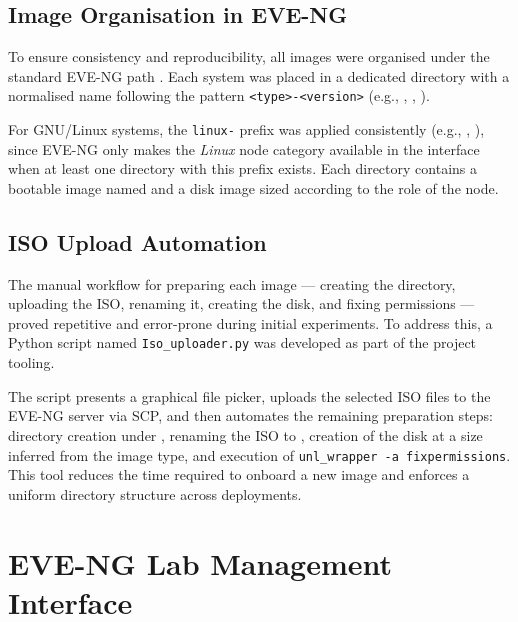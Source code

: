 \subsection{Image Organisation in EVE-NG}

To ensure consistency and reproducibility, all images were organised under the
standard EVE-NG path . Each system was placed in
a dedicated directory with a normalised name following the pattern
\texttt{<type>-<version>} (e.g., ,
, ).

For GNU/Linux systems, the \texttt{linux-} prefix was applied consistently
(e.g., , ), since
EVE-NG only makes the \textit{Linux} node category available in the interface when
at least one directory with this prefix exists. Each directory contains a bootable
image named  and a  disk image sized
according to the role of the node.

\subsection{ISO Upload Automation}

The manual workflow for preparing each image --- creating the directory, uploading
the ISO, renaming it, creating the disk, and fixing permissions --- proved repetitive
and error-prone during initial experiments. To address this, a Python script named
\texttt{Iso\_uploader.py} was developed as part of the project tooling.

The script presents a graphical file picker, uploads the selected ISO files to the
EVE-NG server via SCP, and then automates the remaining preparation steps: directory
creation under , renaming the ISO to
, creation of the  disk at a size inferred
from the image type, and execution of \texttt{unl\_wrapper -a fixpermissions}. This
tool reduces the time required to onboard a new image and enforces a uniform
directory structure across deployments.


\section{EVE-NG Lab Management Interface}

